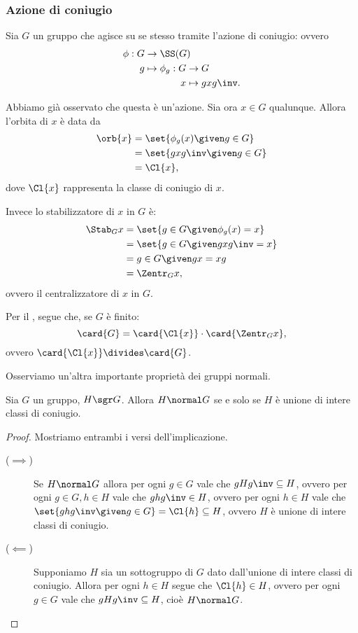 \subsubsection{Azione di coniugio}
Sia $G$ un gruppo che agisce su se stesso tramite l'azione di coniugio: ovvero \begin{align*}
    \phi : G &\to \SS(G)\\
           g &\mapsto 
    \begin{alignedat}[t]{1}
        \phi_g : G &\to G\\
                 x &\mapsto gxg\inv.
    \end{alignedat}
\end{align*}

Abbiamo già osservato che questa è un'azione. Sia ora $x \in G$ qualunque. Allora l'orbita di $x$ è data da
\begin{align*}
    \orb{x} 
    &= \set{\phi_g(x) \given g \in G}\\
    &= \set{gxg\inv \given g \in G}\\
    &= \Cl{x},
\end{align*}
dove $\Cl{x}$ rappresenta la classe di coniugio di $x$.

Invece lo stabilizzatore di $x$ in $G$ è:
\begin{align*}
    \Stab_{G}{x} 
    &= \set{g \in G \given \phi_g(x) = x}\\
    &= \set{g \in G \given gxg\inv = x}\\
    &= {g \in G \given gx = xg}\\
    &= \Zentr_{G}{x},
\end{align*}
ovvero il centralizzatore di $x$ in $G$.

Per il , segue che, se $G$ è finito: \[
    \card{G} = \card{\Cl{x}} \cdot \card{\Zentr_{G}{x}},  
\] ovvero $\card{\Cl{x}} \divides \card{G}$.

Osserviamo un'altra importante proprietà dei gruppi normali.
\begin{proposition}
    \label{prop:H_normal_iff_union_conj}
    Sia $G$ un gruppo, $H \sgr G$. Allora $H \normal G$ se e solo se $H$ è unione di intere classi di coniugio.
\end{proposition}
\begin{proof}
    Mostriamo entrambi i versi dell'implicazione.
    \begin{description}
        \item[($\implies$)] Se $H \normal G$ allora per ogni $g \in G$ vale che $gHg\inv \subseteq H$, ovvero per ogni $g \in G, h \in H$ vale che $ghg\inv \in H$, ovvero per ogni $h \in H$ vale che $\set{ghg\inv \given g \in G} = \Cl{h} \subseteq H$, ovvero $H$ è unione di intere classi di coniugio.
        \item[($\impliedby$)] Supponiamo $H$ sia un sottogruppo di $G$ dato dall'unione di intere classi di coniugio. Allora per ogni $h \in H$ segue che $\Cl{h} \in H$, ovvero per ogni $g \in G$ vale che $gHg\inv \subseteq H$, cioè $H \normal G$. \qedhere 
    \end{description}
\end{proof}

